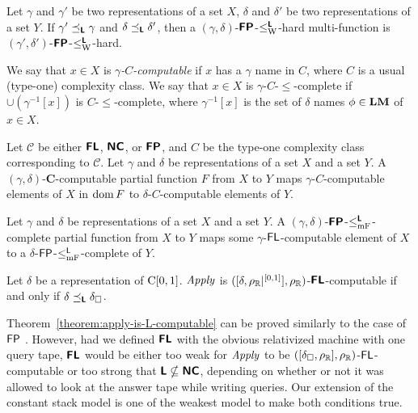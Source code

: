 \documentclass[envcountsame,orivec,oribibl]{llncs}
\begin{document}
\begin{lemma}
 Let $\gamma$ and $\gamma'$ be two representations of a set $X$, 
 $\delta$ and $\delta'$ be two representations of a set $Y$.
 If $\gamma' \preceq_{\text{\bfseries \sffamily \upshape L}} \gamma$ and $\delta \preceq_{\text{\bfseries \sffamily \upshape L}} \delta'$,
 then a $(\gamma, \delta)$-$\text{\bfseries \sffamily \upshape FP}$-$\leq _{\mathrm W} ^{\text{\bfseries \sffamily \upshape L}}$-hard multi-function is
 $(\gamma', \delta')$-$\text{\bfseries \sffamily \upshape FP}$-$\leq _{\mathrm W} ^{\text{\bfseries \sffamily \upshape L}}$-hard.
\end{lemma}

We say that $x \in X$ is \emph{$\gamma$-$C$-computable} if
$x$ has a $\gamma$ name in $C$,
where $C$ is a usual (type-one) complexity class.
We say that $x \in X$ is $\gamma$-$C$-$\le$-complete if
$\cup(\gamma^{-1}[x])$ is $C$-$\le$-complete,
where $\gamma^{-1}[x]$ is the set of $\delta$ names $\phi \in \mathbf{LM}$ of $x \in X$.



\begin{lemma}
 Let $\mathcal C$ be either $\text{\bfseries \sffamily \upshape FL}$, $\text{\bfseries \sffamily \upshape NC}$, 
 or $\text{\bfseries \sffamily \upshape FP}$, and $C$ be the type-one complexity class
 corresponding to $\mathcal C$.
 Let $\gamma$ and $\delta$ be representations of a set $X$ and a set $Y$.
 A $(\gamma, \delta)$-$\mathbf C$-computable partial function $F$ from $X$
 to $Y$ maps $\gamma$-$C$-computable elements of $X$
 in $\mathop{\rm dom} F$ to $\delta$-$C$-computable elements of $Y$.
\end{lemma}

\begin{lemma}
 \label{lemma:p-comp-maps-l-to-p-comp}
 Let $\gamma$ and $\delta$ be representations of a set $X$ and a set $Y$.
 A $(\gamma, \delta)$-$\text{\bfseries \sffamily \upshape FP}$-$\leq _{\mathrm{mF}} ^{\text{\bfseries \sffamily \upshape L}}$-complete partial function 
 from $X$ to $Y$ maps some $\gamma$-$\mathsf{FL}$-computable element of $X$
 to a $\delta$-$\mathsf{FP}$-$\leq _{\mathrm{mF}}^{\mathsf{L}}$-complete of $Y$.
\end{lemma}



\begin{theorem}
 \label{theorem:apply-is-L-computable}
 Let $\delta$ be a representation of $\mathrm C[0, 1]$.
 $\mathit{Apply}$ is $([\delta, \rho _\mathbb R|^{[0,1]}], \rho _\mathbb R)$-$\text{\bfseries \sffamily \upshape FL}$-computable if
 and only if $\delta \preceq_{\text{\bfseries \sffamily \upshape L}} \delta _\square$.
\end{theorem}

Theorem~\ref{theorem:apply-is-L-computable} can be proved 
similarly to the case of $\mathsf{FP}$ 
\cite{kawamura11:_funct_space_repres_and_polyn_time_comput}. 
However, 
had we defined $\text{\bfseries \sffamily \upshape FL}$ with the obvious relativized machine with one query tape,
$\text{\bfseries \sffamily \upshape FL}$ would be either too weak 
for $\mathit{Apply}$ to be $([\delta _\square,\rho _\mathbb R], \rho _\mathbb R)$-$\mathsf{FL}$-computable or
too strong that $\text{\bfseries \sffamily \upshape L} \nsubseteq \text{\bfseries \sffamily \upshape NC}$,
depending on whether or not it was allowed to look at the answer tape while writing queries.
Our extension of the constant stack model is one of the weakest model
to make both conditions true.
\end{document}
